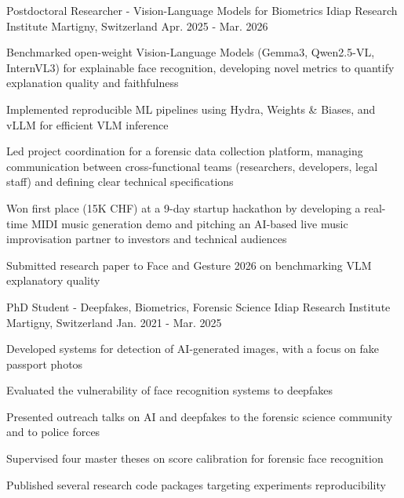 

\begin{cventries}

\cventry
    {Postdoctoral Researcher - Vision-Language Models for Biometrics} %
    {Idiap Research Institute} %
    {Martigny, Switzerland} %
    {Apr. 2025 - Mar. 2026} %
    {
      \begin{cvitems} %
        \item {Benchmarked open-weight Vision-Language Models (Gemma3, Qwen2.5-VL, InternVL3) for explainable face recognition, developing novel metrics to quantify explanation quality and faithfulness}
        \item {Implemented reproducible ML pipelines using Hydra, Weights \& Biases, and vLLM for efficient VLM inference}
        \item {Led project coordination for a forensic data collection platform, managing communication between cross-functional teams (researchers, developers, legal staff) and defining clear technical specifications}
        \item {Won first place (15K CHF) at a 9-day startup hackathon by developing a real-time MIDI music generation demo and pitching an AI-based live music improvisation partner to investors and technical audiences}
        \item {Submitted research paper to Face and Gesture 2026 on benchmarking VLM explanatory quality}
      \end{cvitems}
    }

  \cventry
    {PhD Student - Deepfakes, Biometrics, Forensic Science} %
    {Idiap Research Institute} %
    {Martigny, Switzerland} %
    {Jan. 2021 - Mar. 2025} %
    {
      \begin{cvitems} %
        \item {Developed systems for detection of AI-generated images, with a focus on fake passport photos}
        \item {Evaluated the vulnerability of face recognition systems to deepfakes}
        \item {Presented outreach talks on AI and deepfakes to the forensic science community and to police forces}
        \item {Supervised four master theses on score calibration for forensic face recognition}
        \item {Published several research code packages targeting experiments reproducibility}
      \end{cvitems}
    }


\end{cventries}
